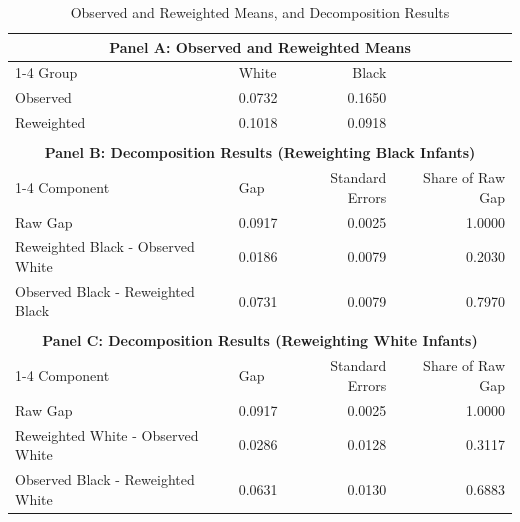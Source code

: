 \begin{table}[ht]
\centering
\caption{Observed and Reweighted Means, and Decomposition Results}
\label{tab:gap_testing_ipw}
\begin{tabular}{llrr}
  \toprule
  \multicolumn{4}{c}{\textbf{Panel A: Observed and Reweighted Means}} \\
  \cmidrule(lr){1-4}
  Group & White & Black \\ 
  \midrule
  Observed & 0.0732 & 0.1650 \\ 
  Reweighted & 0.1018 & 0.0918 \\ 
  \bottomrule
  \\
  \toprule
  \multicolumn{4}{c}{\textbf{Panel B: Decomposition Results (Reweighting Black Infants)}} \\
  \cmidrule(lr){1-4}
  Component & Gap & Standard Errors & Share of Raw Gap \\ 
  \midrule
  Raw Gap & 0.0917 & 0.0025 & 1.0000 \\ 
  Reweighted Black - Observed White & 0.0186 & 0.0079 & 0.2030 \\ 
  Observed Black - Reweighted Black & 0.0731 & 0.0079 & 0.7970 \\ 
  \bottomrule
  \\
  \toprule
  \multicolumn{4}{c}{\textbf{Panel C: Decomposition Results (Reweighting White Infants)}} \\
  \cmidrule(lr){1-4}
  Component & Gap & Standard Errors & Share of Raw Gap \\ 
  \midrule
  Raw Gap & 0.0917 & 0.0025 & 1.0000 \\ 
  Reweighted White - Observed White & 0.0286 & 0.0128 & 0.3117 \\ 
  Observed Black - Reweighted White & 0.0631 & 0.0130 & 0.6883 \\ 
  \bottomrule
\end{tabular}
\end{table}
